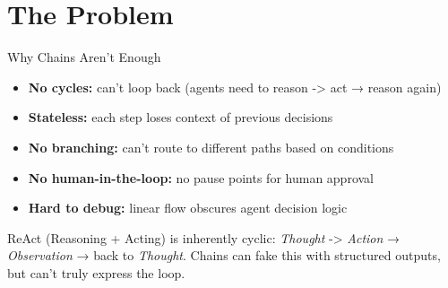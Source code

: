 \documentclass[aspectratio=169,11pt]{beamer}
\begin{document}
\section{The Problem}
\begin{frame}[t]{Why Chains Aren't Enough}
\setlength{\itemsep}{1pt}
\vspace{0.1cm}
\begin{warningbox}
\setlength{\itemsep}{1pt}
\begin{itemize}
  \item \textbf{No cycles:} can't loop back (agents need to reason -> act → reason again)
  \item \textbf{Stateless:} each step loses context of previous decisions
  \item \textbf{No branching:} can't route to different paths based on conditions
  \item \textbf{No human-in-the-loop:} no pause points for human approval
  \item \textbf{Hard to debug:} linear flow obscures agent decision logic
\end{itemize}
\end{warningbox}

\vspace{0.15cm}

\begin{tipbox}
ReAct (Reasoning + Acting) is inherently cyclic: \textit{Thought} -> \textit{Action} → \textit{Observation} → back to \textit{Thought}. Chains can fake this with structured outputs, but can't truly express the loop.
\end{tipbox}
\end{frame}
\end{document}
